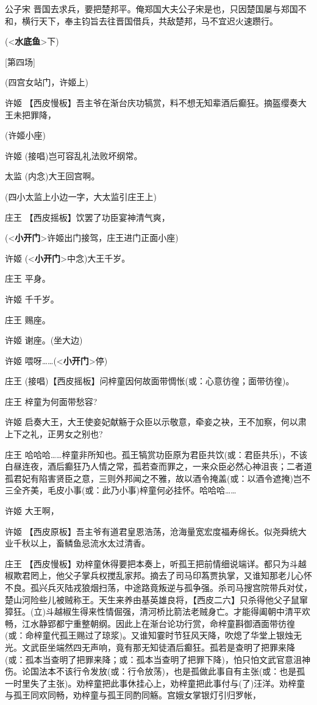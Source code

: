公子宋
晋国去求兵，要把楚邦平。俺郑国大夫公子宋是也，只因楚国屡与郑国不和，横行天下，奉主钧旨去往晋国借兵，共敌楚邦，马不宜迟火速躜行。

(\textless{}\textbf{水底鱼}\textgreater{}下)

{[}第四场{]}

(四宫女站门，许姬上)

许姬
【西皮慢板】吾主爷在渐台庆功犒赏，料不想无知辈酒后癫狂。摘盔缨奏大王未把罪降，

(许姬小座)

许姬 (接唱)岂可容乱礼法败坏纲常。

太监 (内念)大王回宫啊。

(四小太监上小边一字，大太监引庄王上)

庄王 【西皮摇板】饮罢了功臣宴神清气爽，

(\textless{}\textbf{小开门}\textgreater{}许姬出门接驾，庄王进门正面小座)

许姬 (\textless{}\textbf{小开门}\textgreater{}中念)大王千岁。

庄王 平身。

许姬 千千岁。

庄王 赐座。

许姬 谢座。(坐大边)

许姬 喂呀\ldots{}\ldots{}(\textless{}\textbf{小开门}\textgreater{}停)

庄王 (接唱)【西皮摇板】问梓童因何故面带惆怅(或：心意彷徨；面带彷徨)。

庄王 梓童为何面带愁容?

许姬
启奏大王，大王使妾妃献觞于众臣以示敬意，牵妾之袂，王不加察，何以肃上下之礼，正男女之别也?

庄王
哈哈哈\ldots{}\ldots{}梓童非所知也。孤王犒赏功臣原为君臣共饮(或：君臣共乐)，不该白昼连夜，酒后癫狂乃人情之常，孤若查而罪之，一来众臣必然心神沮丧；二者道孤君妃有陷害贤臣之意，三则外邦闻之不雅，故以酒令掩盖(或：以酒令遮掩)岂不三全齐美，毛皮小事(或：此乃小事)梓童何必挂怀。哈哈哈\ldots{}\ldots{}

许姬 大王啊，

许姬
【西皮原板】吾主爷有道君皇恩浩荡，沧海量宽宏度福寿绵长。似尧舜统大业千秋以上，畜鳞鱼忌流水太过清香。

庄王
【西皮慢板】劝梓童休得要把本奏上，听孤王把前情细说端详。都只为斗越椒欺君罔上，他父子掌兵权搅乱家邦。摘去了司马印蒍贾执掌，又谁知那老儿心怀不良。孤兴兵灭陆戎狼烟扫荡，中途路竟叛逆与孤争强。杀司马搜宫院带兵对仗，楚山河险些儿被贼称王。天生来养由基英雄良将，【西皮二六】只杀得他父子鼠窜獐狂。(立)斗越椒生得来性情倔强，清河桥比箭法老贼身亡。才能得阖朝中清平欢畅，江水静郢都宁重整朝纲。因此上在渐台论功行赏，命梓童斟御酒面带彷徨(或：命梓童代孤王赐过了琼浆)。又谁知霎时节狂风天降，吹熄了华堂上银烛无光。文武臣坐端然四无声响，竟有那无知徒酒后癫狂。孤若是查明了把罪来降(或：孤本当查明了把罪来降；或：孤本当查明了把罪下降)，怕只怕文武官意沮神伤。论国法本不该行令发放(或：行令放荡)，也是孤做此事自有主张(或：也是孤一时里失了主张)。劝梓童把此事休挂心上，劝梓童把此事付与(了)汪洋。劝梓童与孤王同欢同畅，劝梓童与孤王同酌同觞。宫娥女掌银灯引归罗帐，

